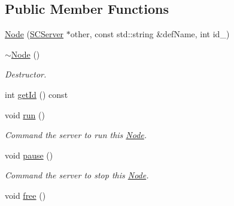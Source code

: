 \subsection*{Public Member Functions}
\begin{DoxyCompactItemize}
\item 
\hyperlink{classsc_1_1Node_aebe6b60f2f6312495480d0a2e01c7efa}{Node} (\hyperlink{classsc_1_1SCServer}{S\-C\-Server} $\ast$other, const std\-::string \&def\-Name, int id\-\_\-)
\item 
\hypertarget{classsc_1_1Node_a12fa05f533aa00bf553b9a46db1fcd45}{\hyperlink{classsc_1_1Node_a12fa05f533aa00bf553b9a46db1fcd45}{$\sim$\-Node} ()}\label{classsc_1_1Node_a12fa05f533aa00bf553b9a46db1fcd45}

\begin{DoxyCompactList}\small\item\em Destructor. \end{DoxyCompactList}\item 
int \hyperlink{classsc_1_1Node_ae9fd8f68186f13b1402c542192b98e63}{get\-Id} () const 
\item 
\hypertarget{classsc_1_1Node_a21719bc1c64204fe09351e42f2dc4894}{void \hyperlink{classsc_1_1Node_a21719bc1c64204fe09351e42f2dc4894}{run} ()}\label{classsc_1_1Node_a21719bc1c64204fe09351e42f2dc4894}

\begin{DoxyCompactList}\small\item\em Command the server to run this \hyperlink{classsc_1_1Node}{Node}. \end{DoxyCompactList}\item 
\hypertarget{classsc_1_1Node_a4e39d4f8bfd05a8f710184ac7153b269}{void \hyperlink{classsc_1_1Node_a4e39d4f8bfd05a8f710184ac7153b269}{pause} ()}\label{classsc_1_1Node_a4e39d4f8bfd05a8f710184ac7153b269}

\begin{DoxyCompactList}\small\item\em Command the server to stop this \hyperlink{classsc_1_1Node}{Node}. \end{DoxyCompactList}\item 
\hypertarget{classsc_1_1Node_a5e78540a85cd945dabb0f5cf9571fd03}{void \hyperlink{classsc_1_1Node_a5e78540a85cd945dabb0f5cf9571fd03}{free} ()}\label{classsc_1_1Node_a5e78540a85cd945dabb0f5cf9571fd03}


\end{DoxyCompactItemize}
